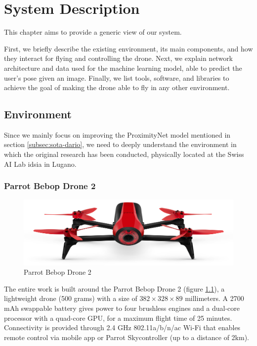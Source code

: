 \chapter{System Description}
\label{chap:system}


This chapter aims to provide a generic view of our system.

First, we briefly describe the existing environment, its main components, and how they interact for flying and controlling the drone. Next, we explain network architecture and data used for the machine learning model, able to predict the user's pose given an image. Finally, we list tools, software, and libraries to achieve the goal of making the drone able to fly in any other environment. %




\section{Environment}
\label{sec:hardware}

Since we mainly focus on improving the ProximityNet model mentioned in section \ref{subsec:sota-dario}, we need to deeply understand the environment in which the original research has been conducted, physically located at the Swiss AI Lab \gls{idsia} in Lugano.



\subsection{Parrot Bebop Drone 2}
\label{subsec:bebop}

\begin{figure}[!htb]
	\centering
	\includegraphics[width=.8\textwidth]{"contents/images/03-Parrot-Bebop-2"}
	\caption[Parrot Bebop Drone 2]{Parrot Bebop Drone 2}
	\label{fig:bebop}
\end{figure}

The entire work is built around the Parrot Bebop Drone 2 (figure \ref{fig:bebop}), a lightweight drone (500 grams) with a size of $382 \times 328 \times 89$ millimeters. A 2700 mAh swappable battery gives power to four brushless engines and a dual-core processor with a quad-core GPU, for a maximum flight time of 25 minutes. Connectivity is provided through 2.4 GHz 802.11a/b/n/ac Wi-Fi that enables remote control via mobile app or Parrot Skycontroller (up to a distance of 2km).

